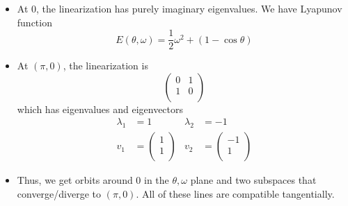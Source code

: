 \documentclass[../notes.tex]{subfiles}
\begin{document}
\begin{itemize}
\begin{itemize}
        \item At 0, the linearization has purely imaginary eigenvalues. We have Lyapunov function
        \begin{equation*}
            E(\theta,\omega) = \frac{1}{2}\omega^2+(1-\cos\theta)
        \end{equation*}
        \item At $(\pi,0)$, the linearization is
        \begin{equation*}
            \begin{pmatrix}
                0 & 1\\
                1 & 0\\
            \end{pmatrix}
        \end{equation*}
        which has eigenvalues and eigenvectors
        \begin{align*}
            \lambda_1 &= 1&
                \lambda_2 &= -1\\
            v_1 &=
            \begin{pmatrix}
                1\\
                1\\
            \end{pmatrix}&
                v_2 &=
                \begin{pmatrix}
                    -1\\
                    1\\
                \end{pmatrix}
        \end{align*}
        \item Thus, we get orbits around 0 in the $\theta,\omega$ plane and two subspaces that converge/diverge to $(\pi,0)$. All of these lines are compatible tangentially.
    \end{itemize}
\end{itemize}
\end{document}
